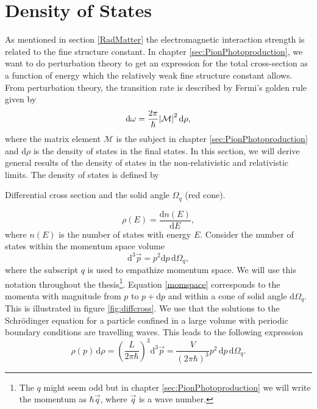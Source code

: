 \section{Density of States}\label{sec:densityofstates}
As mentioned in section \ref{RadMatter} the electromagnetic interaction strength is related to the fine structure constant. In chapter \ref{sec:PionPhotoproduction}, we want to do perturbation theory to get an expression for the total cross-section as a function of energy which the relatively weak fine structure constant allows. From perturbation theory, the transition rate is described by Fermi's golden rule given by
\begin{equation} \label{FermiGolden}
	\text{d}\omega = \frac{2\pi}{\hbar}\abs{\mathcal{M}}^2 \text{d}\rho,
\end{equation}
where the matrix element $\mathcal{M}$ is the subject in chapter \ref{sec:PionPhotoproduction} and $\text{d}\rho$ is the density of states in the final states. In this section, we will derive general results of the density of states in the non-relativistic and relativistic limits. The density of states is defined by
\begin{marginfigure}
	\centering
	
	\caption{Differential cross section and the solid angle $\Omega_q$ (red cone).}
	\label{fig:diffcross}
\end{marginfigure}
\begin{equation} \label{DensityOfStates}
	\rho(E) = \frac{\text{d}n(E)}{\text{d}E},
\end{equation}
where $n(E)$ is the number of states with energy $E$. Consider the number of states within the momentum space volume
\begin{equation} \label{momspace}
	\text{d}^3\vec{p} = p^2 \text{d}p \, \text{d}\Omega_q,
\end{equation}
where the subscript $q$ is used to empathize momentum space. We will use this notation throughout the thesis\footnote{The $q$ might seem odd but in chapter \ref{sec:PionPhotoproduction} we will write the momentum as $\hbar \vec{q}$, where $\vec{q}$ is a wave number.}. Equation \eqref{momspace} corresponds to the momenta with magnitude from $p$ to $p+\text{d}p$ and within a cone of solid angle $\text{d}\Omega_q$. This is illustrated in figure \ref{fig:diffcross}. We use that the solutions to the Schrödinger equation for a particle confined in a large volume with periodic boundary conditions are travelling waves. This leads to the following expression
\begin{equation} \label{densityrho}
	\rho(p) \, \text{d}\rho = \left( \frac{L}{2\pi\hbar}\right)^3 \text{d}^3 \vec{p} = \frac{V}{(2\pi\hbar)^3} p^2 \, \text{d}p \, \text{d}\Omega_q.
\end{equation}
